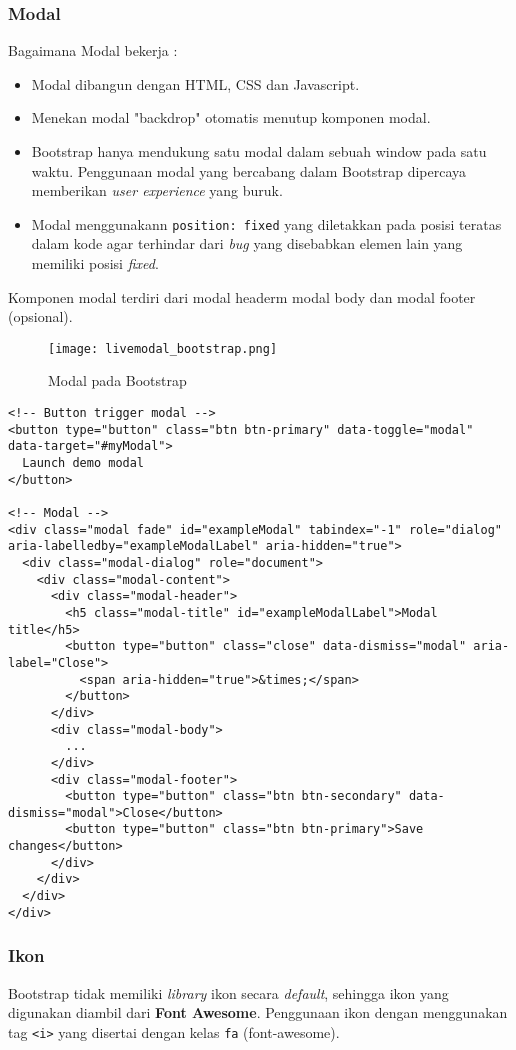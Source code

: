{\subsubsection{Modal}
Bagaimana Modal bekerja :
\begin{itemize}
\item Modal dibangun dengan HTML, CSS dan Javascript. 
\item Menekan modal "backdrop" otomatis menutup komponen modal.
\item Bootstrap hanya mendukung satu modal dalam sebuah window pada satu waktu. Penggunaan modal yang bercabang dalam Bootstrap dipercaya memberikan \textit{user experience} yang buruk.
\item Modal menggunakann \texttt{position: fixed} yang diletakkan pada posisi teratas dalam kode agar terhindar dari \textit{bug} yang disebabkan elemen lain yang memiliki posisi \textit{fixed}. 
\end{itemize}
Komponen modal terdiri dari modal headerm modal body dan modal footer (opsional).
\begin{figure} [H]
	\centering  
	\texttt{[image: livemodal\_bootstrap.png]}  
	\caption{Modal pada Bootstrap} 
\end{figure}
\begin{lstlisting}[frame=single, basicstyle=\tiny] 
<!-- Button trigger modal -->
<button type="button" class="btn btn-primary" data-toggle="modal" data-target="#myModal">
  Launch demo modal
</button>

<!-- Modal -->
<div class="modal fade" id="exampleModal" tabindex="-1" role="dialog" 
aria-labelledby="exampleModalLabel" aria-hidden="true">
  <div class="modal-dialog" role="document">
    <div class="modal-content">
      <div class="modal-header">
        <h5 class="modal-title" id="exampleModalLabel">Modal title</h5>
        <button type="button" class="close" data-dismiss="modal" aria-label="Close">
          <span aria-hidden="true">&times;</span>
        </button>
      </div>
      <div class="modal-body">
        ...
      </div>
      <div class="modal-footer">
        <button type="button" class="btn btn-secondary" data-dismiss="modal">Close</button>
        <button type="button" class="btn btn-primary">Save changes</button>
      </div>
    </div>
  </div>
</div>
\end{lstlisting}

\subsubsection{Ikon}
Bootstrap tidak memiliki \textit{library} ikon secara \textit{default}, sehingga ikon yang digunakan diambil dari \textbf{Font Awesome}. Penggunaan ikon dengan menggunakan tag \texttt{<i>} yang disertai dengan kelas \texttt{fa} (font-awesome). 

}
